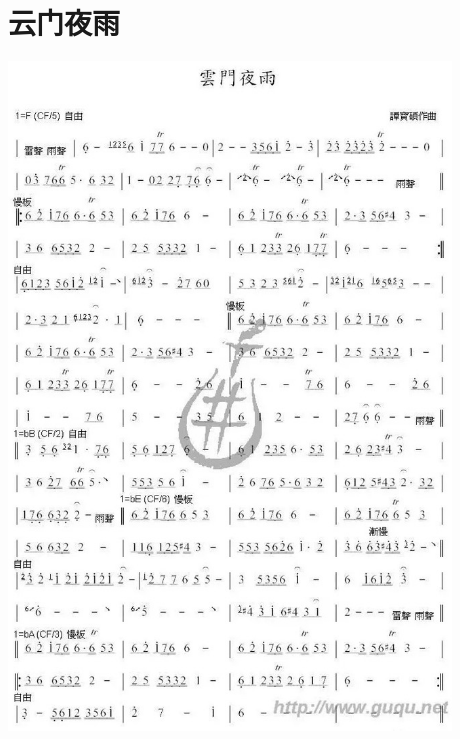 \documentclass[cn,pad,twocol]{elegantbook}
\begin{document}
\section{云门夜雨}\includegraphics[width=0.88\textwidth]{dongxiao/20200819/云门夜雨.jpeg}
\end{document}
